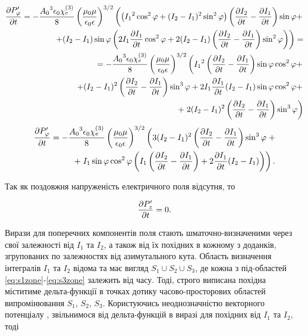 \textcolor{blue} { \begin{equation*} \begin{aligned}
\frac{\partial P_\varphi^\prime}{\partial t}   = 
- \frac{ {A_0}^3 \epsilon_0 \chi_e^{(3)} }{ 8 } 
\left( \frac{\mu_0 \mu} {\epsilon_0 \epsilon} \right)^{3/2} \left(
\left( {I_1}^2 \cos^2 \varphi + ( I_2 - I_1 )^2 \sin^2 \varphi \right)
\left( \frac{\partial I_2}{\partial t} - \frac{\partial I_1}{\partial t} \right) \sin \varphi + \right. \\
\left. + (I_2 - I_1) \sin \varphi \left( 2 I_1 \frac{\partial I_1}{\partial t} \cos^2 \varphi + 
2 ( I_2 - I_1 ) \left( \frac{\partial I_2}{\partial t} - \frac{\partial I_1}{\partial t} \right) 
\sin^2 \varphi \right) \right) = \\ 
= - \frac{ {A_0}^3 \epsilon_0 \chi_e^{(3)} }{ 8 } 
\left( \frac{\mu_0 \mu} {\epsilon_0 \epsilon} \right)^{3/2} \left(
{I_1}^2 \left( \frac{\partial I_2}{\partial t} - \frac{\partial I_1}{\partial t} \right) 
\sin \varphi \cos^2 \varphi + \right. \\ \left. 
+ ( I_2 - I_1 )^2 \left( \frac{\partial I_2}{\partial t} - \frac{\partial I_1}{\partial t} \right) 
\sin^3 \varphi + 2 I_1 \frac{\partial I_1}{\partial t} (I_2 - I_1) 
\sin \varphi \cos^2 \varphi + \right. \\ 
+ \left. 2 ( I_2 - I_1 )^2 \left( \frac{\partial I_2}{\partial t} - \frac{\partial I_1}{\partial t} \right) 
\sin^3 \varphi \right)
\end{aligned} \end{equation*} }
%
\begin{equation*} \begin{aligned}
\frac{\partial P_\varphi^\prime}{\partial t} = 
- \frac{ {A_0}^3 \epsilon_0 \chi_e^{(3)} }{ 8 } 
\left( \frac{\mu_0 \mu} {\epsilon_0 \epsilon} \right)^{3/2} \left(
3 ( I_2 - I_1 )^2 \left( \frac{\partial I_2}{\partial t} - \frac{\partial I_1}{\partial t} \right)
\sin^3 \varphi \right. + \\
+ \left. I_1 \sin \varphi \cos^2 \varphi \left( 
I_1 \left( \frac{\partial I_2}{\partial t} - \frac{\partial I_1}{\partial t} \right) + 
2 \frac{\partial I_1}{\partial t} (I_2 - I_1) \right) \right).
\end{aligned} \end{equation*}

Так як поздовжня напруженість електричного поля відсутня, то

\begin{equation*} \begin{aligned}
\frac{\partial P_z^\prime}{\partial t} = 0.
\end{aligned} \end{equation*}

Вирази для поперечних компонентів поля стають шматочно-визначеними
через свої залежності від $ I_1 $ та $ I_2 $, а також від їх похідних в 
кожному з доданків, згрупованих по залежностях від азимутального кута.
Область визначення інтегралів $ I_1 $ та $ I_2 $ відома та має вигляд 
$ S_1 \cup S_2 \cup S_3 $, де кожна з під-областей 
\eqref{eq:s1zone}-\eqref{eq:s3zone} залежить від часу.
Тоді, строго виписана похідна міститиме дельта-функції в точках дотику
часово-просторових областей випромінювання $ S_1 $, $ S_2 $, $ S_3 $.
Користуючись неоднозначністю векторного потенціалу 
\cite[ст. 77]{imp:LandauII}, звільнимося від дельта-функцій в виразі для 
похідних від $ I_1 $ та $ I_2 $, тоді

